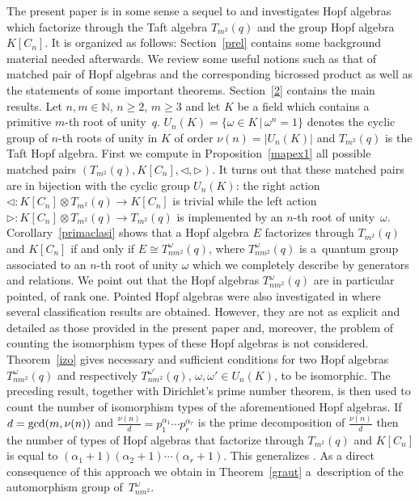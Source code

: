 \documentclass[10pt,a4paper]{amsart}
\numberwithin{equation}{section}
\begin{document}
The present paper is in some sense a sequel to \cite{abm} and investigates Hopf algebras which factorize through the Taft algebra $T_{m^{2}}(q)$ and the group Hopf algebra $K[C_{n}]$. It is organized as follows: Section~\ref{prel} contains some background material needed afterwards. We review some useful notions such as that of matched pair of Hopf algebras and the corresponding bicrossed product as well as the statements of some important theorems. Section~\ref{2} contains the main results. Let $n, m \in \mathbb{N}$, $n \geqslant 2$, $m \geqslant 3$ and let $K$ be a field
which contains a primitive $m$-th root of unity~$q$. $U_n (K) = \{\omega \in K \,|\, \omega^n = 1 \}$ denotes the cyclic group of $n$-th roots of unity in $K$ of order $\nu (n) = |U_n (K)|$ and $T_{m^{2}}(q)$ is the Taft Hopf algebra. First we compute in Proposition~\ref{mapex1} all possible matched pairs $(T_{m^{2}}(q), K[C_n], \triangleleft, \triangleright)$. It turns out that these matched pairs are in bijection with the cyclic group $U_n (K)$: the right action $\triangleleft \colon K[C_{n}] \otimes T_{m^{2}}(q) \to K[C_{n}]$ is trivial while the left action $\triangleright \colon K[C_{n}] \otimes T_{m^{2}}(q) \to T_{m^{2}}(q)$ is implemented by an $n$-th root of unity~$\omega$. Corollary~\ref{primaclasi} shows that a Hopf algebra $E$ factorizes through $T_{m^{2}}(q)$ and $K[C_n]$ if and only if $E \cong T_{nm^{2}}^ {\omega}(q)$, where $T_{nm^{2}}^ {\omega}(q)$ is a~quantum group associated to an $n$-th root of unity $\omega$ which we completely describe by generators and relations. We point out that the Hopf algebras $T_{nm^{2}}^ {\omega}(q)$ are in particular pointed, of rank one. Pointed Hopf algebras were also investigated in \cite{K,S,W} where several classification results are obtained. However, they are not as explicit and detailed as those provided in the present paper and, moreover, the problem of counting the isomorphism types of these Hopf algebras is not considered. Theorem~\ref{izo} gives necessary and sufficient conditions for two Hopf algebras $T_{nm^{2}}^ {\omega}(q)$ and respectively $T_{nm^{2}}^ {\omega'}(q)$, $\omega, \omega ' \in U_n (K)$, to be isomorphic. The
preceding result, together with Dirichlet's prime number theorem, is then used to count the number of isomorphism types of the aforementioned
Hopf algebras. If $d = {\rm gcd}(m, \nu (n))$ and $\frac{\nu(n)}{d} = p_1^{\alpha_1} \cdots p_r^{\alpha_r}$ is the prime decomposition of
$ \frac{\nu(n)}{d}$ then the number of types of Hopf algebras that factorize through $T_{m^{2}}(q)$ and $K[C_n]$ is equal to $(\alpha_1 + 1)(\alpha_2 + 1) \cdots (\alpha_r + 1)$. This generalizes \cite[Theorem~5.10]{abm}. As a direct consequence of this approach we obtain in Theorem~\ref{graut} a~description of the automorphism group of~$T_{nm^{2}}^ {\omega}$.
\end{document}
